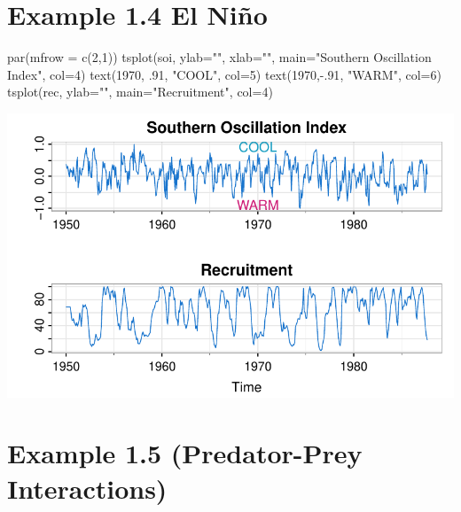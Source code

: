 \documentclass[
  letterpaper,
  DIV=11,
  numbers=noendperiod]{scrreprt}
\newenvironment{Shaded}{\begin{snugshade}}{\end{snugshade}}
\newcommand{\AttributeTok}[1]{\textcolor[rgb]{0.40,0.45,0.13}{#1}}
\newcommand{\DecValTok}[1]{\textcolor[rgb]{0.68,0.00,0.00}{#1}}
\newcommand{\FunctionTok}[1]{\textcolor[rgb]{0.28,0.35,0.67}{#1}}
\newcommand{\NormalTok}[1]{\textcolor[rgb]{0.00,0.23,0.31}{#1}}
\newcommand{\SpecialCharTok}[1]{\textcolor[rgb]{0.37,0.37,0.37}{#1}}
\newcommand{\StringTok}[1]{\textcolor[rgb]{0.13,0.47,0.30}{#1}}
\begin{document}
\section{Example 1.4 El Niño}\label{example-1.4-el-niuxf1o}

\begin{Shaded}
\begin{Highlighting}[]
\FunctionTok{par}\NormalTok{(}\AttributeTok{mfrow =} \FunctionTok{c}\NormalTok{(}\DecValTok{2}\NormalTok{,}\DecValTok{1}\NormalTok{))}
\FunctionTok{tsplot}\NormalTok{(soi, }\AttributeTok{ylab=}\StringTok{""}\NormalTok{, }\AttributeTok{xlab=}\StringTok{""}\NormalTok{, }\AttributeTok{main=}\StringTok{"Southern Oscillation Index"}\NormalTok{, }\AttributeTok{col=}\DecValTok{4}\NormalTok{)}
\FunctionTok{text}\NormalTok{(}\DecValTok{1970}\NormalTok{, .}\DecValTok{91}\NormalTok{, }\StringTok{"COOL"}\NormalTok{, }\AttributeTok{col=}\DecValTok{5}\NormalTok{)}
\FunctionTok{text}\NormalTok{(}\DecValTok{1970}\NormalTok{,}\SpecialCharTok{{-}}\NormalTok{.}\DecValTok{91}\NormalTok{, }\StringTok{"WARM"}\NormalTok{, }\AttributeTok{col=}\DecValTok{6}\NormalTok{)}
\FunctionTok{tsplot}\NormalTok{(rec, }\AttributeTok{ylab=}\StringTok{""}\NormalTok{, }\AttributeTok{main=}\StringTok{"Recruitment"}\NormalTok{, }\AttributeTok{col=}\DecValTok{4}\NormalTok{) }
\end{Highlighting}
\end{Shaded}

\includegraphics{LectureNotes/Lecture1_files/figure-pdf/ex-1-4-1.pdf}

\section{\texorpdfstring{{Example 1.5 (Predator-Prey
Interactions)}}{Example 1.5 (Predator-Prey Interactions)}}\label{example-1.5-predator-prey-interactions}
\end{document}
